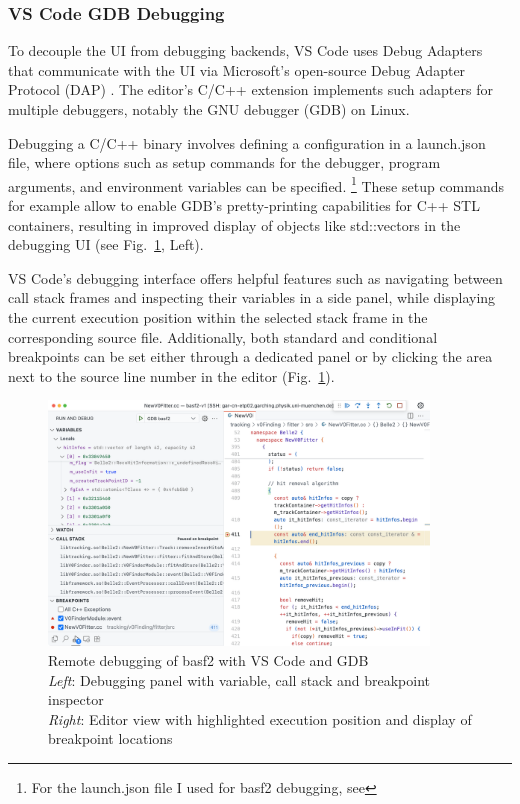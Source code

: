 \subsubsection{VS Code GDB Debugging}
To decouple the UI from debugging backends, VS Code uses Debug Adapters that communicate with the UI via Microsoft's open-source Debug Adapter Protocol (DAP) \cite{dap}.
The editor's C/C++ extension \cite{vscode-cpptools} implements such adapters for multiple debuggers, notably the GNU debugger (GDB) \cite{gdb} on Linux.

Debugging a C/C++ binary involves defining a configuration in a launch.json file, where options such as setup commands for the debugger, program arguments, and environment variables can be specified.%
\footnote{For the launch.json file I used for basf2 debugging, see }
These setup commands for example allow to enable GDB's pretty-printing capabilities for C++ STL containers, resulting in improved display of objects like std::vectors in the debugging UI (see Fig.\ \ref{fig:vscode-debugging}, Left).

VS Code's debugging interface offers helpful features such as navigating between call stack frames and inspecting their variables in a side panel, while displaying the current execution position within the selected stack frame in the corresponding source file.
Additionally, both standard and conditional breakpoints can be set either through a dedicated panel or by clicking the area next to the source line number in the editor (Fig.\ \ref{fig:vscode-debugging}).

\begin{figure}[h]
  \centering
  \includegraphics[width=0.9\textwidth]{static/vscode-debugging.png}
  \caption{Remote debugging of basf2 with VS Code and GDB\\%
    \emph{Left}: Debugging panel with variable, call stack and breakpoint inspector\\%
    \emph{Right}: Editor view with highlighted execution position and display of breakpoint locations
  }
  \label{fig:vscode-debugging}
\end{figure}

